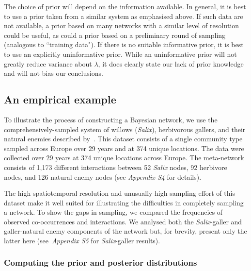 \documentclass[12pt]{article}
\begin{document}
\begin{spacing}{2.0}
      The choice of prior will depend on the information available. In general, it is best to use a prior taken from a similar system as emphasised above. If such data are not available, a prior based on many networks with a similar level of resolution could be useful, as could a prior based on a preliminary round of sampling (analogous to ``training data"). If there is no suitable informative prior, it is best to use an explicitly uninformative prior. While an uninformative prior will not greatly reduce variance about $\lambda$, it does clearly state our lack of prior knowledge and will not bias our conclusions.


  \subsection*{An empirical example}

      To illustrate the process of constructing a Bayesian network, we use the comprehensively-sampled system of willows (\emph{Salix}), herbivorous gallers, and their natural enemies described by~\citet{Kopelke2017}. This dataset consists of a single community type sampled across Europe over 29 years and at 374 unique locations. The data were collected over 29 years at 374 unique locations across Europe. The meta-network consists of 1,173 different interactions between 52 \emph{Salix} nodes, 92 herbivore nodes, and 126 natural enemy nodes (see \emph{Appendix S4} for details). 


      The high spatiotemporal resolution and unusually high sampling effort of this dataset make it well suited for illustrating the difficulties in completely sampling a network. To show the gaps in sampling, we compared the frequencies of observed co-occurrences and interactions. We analysed both the \emph{Salix}-galler and galler-natural enemy components of the network but, for brevity, present only the latter here (see~\emph{Appendix S5} for \emph{Salix}-galler results). 


    \subsubsection*{Computing the prior and posterior distributions}


\end{spacing}
\end{document}
